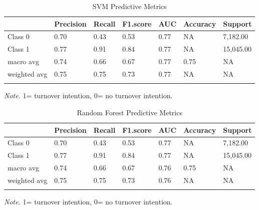 \documentclass[
  man]{apa7}
\begin{document}
\begin{table}[tbp]

\begin{center}
\begin{threeparttable}

\caption{\label{tab:svm40}SVM Predictive Metrics}

\begin{tabular}{lllllll}
\toprule
 & \multicolumn{1}{c}{Precision} & \multicolumn{1}{c}{Recall} & \multicolumn{1}{c}{F1.score} & \multicolumn{1}{c}{AUC} & \multicolumn{1}{c}{Accuracy} & \multicolumn{1}{c}{Support}\\
\midrule
Class 0 & 0.70 & 0.43 & 0.53 & 0.77 & NA & 7,182.00\\
Class 1 & 0.77 & 0.91 & 0.84 & 0.77 & NA & 15,045.00\\
macro avg & 0.74 & 0.66 & 0.67 & 0.77 & 0.75 & NA\\
weighted avg & 0.75 & 0.75 & 0.73 & 0.77 & NA & NA\\
\bottomrule
\addlinespace
\end{tabular}

\begin{tablenotes}[para]
\normalsize{\textit{Note.} 1= turnover intention, 0= no turnover intention.}
\end{tablenotes}

\end{threeparttable}
\end{center}

\end{table}

\begin{table}[tbp]

\begin{center}
\begin{threeparttable}

\caption{\label{tab:rf40}Random Forest Predictive Metrics}

\begin{tabular}{lllllll}
\toprule
 & \multicolumn{1}{c}{Precision} & \multicolumn{1}{c}{Recall} & \multicolumn{1}{c}{F1.score} & \multicolumn{1}{c}{AUC} & \multicolumn{1}{c}{Accuracy} & \multicolumn{1}{c}{Support}\\
\midrule
Class 0 & 0.70 & 0.43 & 0.53 & 0.77 & NA & 7,182.00\\
Class 1 & 0.77 & 0.91 & 0.84 & 0.77 & NA & 15,045.00\\
macro avg & 0.74 & 0.66 & 0.67 & 0.76 & 0.75 & NA\\
weighted avg & 0.75 & 0.75 & 0.73 & 0.76 & NA & NA\\
\bottomrule
\addlinespace
\end{tabular}

\begin{tablenotes}[para]
\normalsize{\textit{Note.} 1= turnover intention, 0= no turnover intention.}
\end{tablenotes}

\end{threeparttable}
\end{center}

\end{table}
\end{document}
